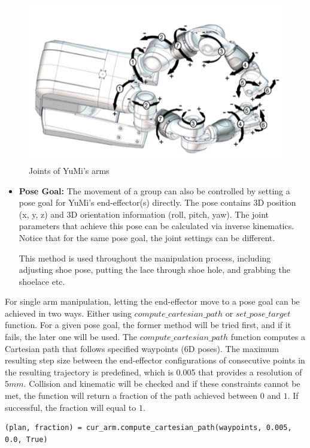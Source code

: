 \begin{figure}[H]
\centering
\includegraphics[width = 0.7\columnwidth]{Implementation/mp/yumijoints.png}
\caption{Joints of YuMi's arms \citep{ABBsDual5:online}}
\label{yumijoint}
\end{figure}

\begin{itemize}
    \item \textbf{Pose Goal:} The movement of a group can also be controlled by setting a pose goal for YuMi's end-effector(s) directly. The pose contains 3D position (x, y, z) and 3D orientation information (roll, pitch, yaw). The joint parameters that achieve this pose can be calculated via inverse kinematics. Notice that for the same pose goal, the joint settings can be different.
    
    This method is used throughout the manipulation process, including adjusting shoe pose, putting the lace through shoe hole, and grabbing the shoelace etc.
\end{itemize}

For single arm manipulation, letting the end-effector move to a pose goal can be achieved in two ways. Either using $compute\_cartesian\_path$ or $set\_pose\_target$ function. For a given pose goal, the former method will be tried first, and if it fails, the later one will be used. The $compute\_cartesian\_path$ function computes a Cartesian path that follows specified waypoints (6D poses). The maximum resulting step size between the end-effector configurations of consecutive points in the resulting trajectory is predefined, which is 0.005 that provides a resolution of $5mm$. Collision and kinematic will be checked and if these constraints cannot be met, the function will return a fraction of the path achieved between $0$ and $1$. If successful, the fraction will equal to $1$.

\begin{verbatim}
(plan, fraction) = cur_arm.compute_cartesian_path(waypoints, 0.005, 0.0, True)
\end{verbatim}

